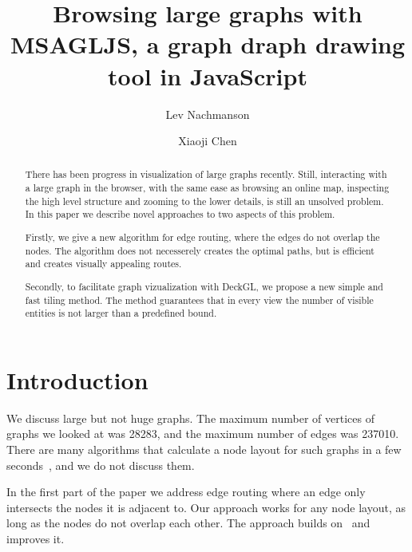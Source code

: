 \documentclass{gd-llncs}
\begin{document}
\title{Browsing large graphs with MSAGLJS, a graph draph drawing tool in JavaScript }
\author{%
  Lev Nachmanson  \and
  Xiaoji Chen
}%
\maketitle


\begin{abstract}
  There has been progress in visualization of large graphs recently. Still, interacting with a large graph in the browser, with the same ease as browsing an online map, inspecting the high level structure and zooming to the lower details, is still an unsolved problem. In this paper we describe novel approaches to two aspects of this problem.

  Firstly, we give a new algorithm for edge routing, where the edges do not overlap the nodes. The algorithm does not necesserely creates the optimal paths, but is efficient and creates visually appealing routes.

  Secondly, to facilitate graph vizualization with DeckGL, we propose a new simple and fast tiling method. The method guarantees that in every view the number of visible entities is not larger than a predefined bound.
\end{abstract}


\section*{Introduction}

\label{sec:intro}

We discuss large but not huge graphs. The maximum number of vertices of graphs we looked at was 28283, and the maximum number of edges was 237010. There are many algorithms that calculate a node layout for such graphs in a few seconds~\cite{hu2015visualizing,brandes2007eigensolver}, and we do not discuss them.

In the first part of the paper we address edge routing where an edge only intersects the nodes it is adjacent to. Our approach works for any node layout, as long as the nodes do not overlap each other. The approach builds on~\cite{dwyer2010fast} and improves it.
\end{document}
